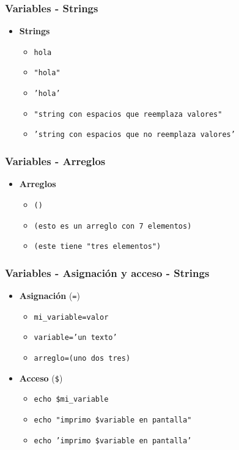 \begin{frame}
  \frametitle{Variables - Strings}
  \begin{itemize}
    \item \textbf{Strings}
    \begin{itemize}
      \item \texttt{hola}
      \item \texttt{\string"hola\string"}
      \item \texttt{\string'hola\string'}
      \item \texttt{\string"string con espacios que reemplaza valores\string"}
      \item \texttt{\string'string con espacios que no reemplaza valores\string'}
    \end{itemize}
  \end{itemize}
\end{frame}

\begin{frame}
  \frametitle{Variables - Arreglos}
  \begin{itemize}
    \item \textbf{Arreglos}
    \begin{itemize}
      \item \texttt{()}
      \item \texttt{(esto es un arreglo con 7 elementos)}
      \item \texttt{(este tiene \string"tres elementos\string")}
    \end{itemize}
  \end{itemize}
\end{frame}

\begin{frame}
  \frametitle{Variables - Asignación y acceso - Strings}
  \begin{itemize}
    \item \textbf{Asignación} (\texttt{=})
    \begin{itemize}
      \item \texttt{mi\_variable=valor}
      \item \texttt{variable=\string'un texto\string'}
      \item \texttt{arreglo=(uno dos tres)}
    \end{itemize}
    \item \textbf{Acceso} (\texttt{\${}})
    \begin{itemize}
      \item \texttt{echo \$mi\_variable}
      \item \texttt{echo \string"imprimo \$variable en pantalla\string"}
      \item \texttt{echo \string'imprimo \$variable en pantalla\string'}
    \end{itemize}
  \end{itemize}
\end{frame}

